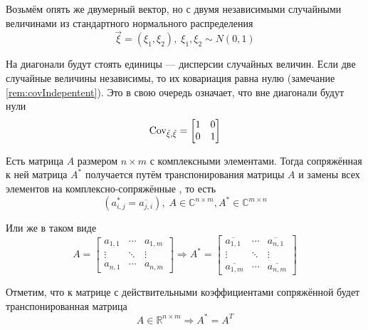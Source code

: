 \begin{example}
    Возьмём опять же двумерный вектор, но с двумя независимыми
    случайными величинами из стандартного нормального распределения
    $$\vec{\xi} = \left( \xi_1, \xi_2 \right),\;
        \xi_1, \xi_2 \sim N\left( 0, 1 \right)$$

    На диагонали будут стоять единицы --- дисперсии случайных величин.
    Если две случайные величины независимы, то их ковариация равна нулю
    (замечание \ref{rem:covIndepentent}).
    Это в свою очередь означает, что вне диагонали
    будут нули
    $$\operatorname{Cov_{\vec{\xi}, \vec{\xi}}} =
    \begin{bmatrix}
        1 & 0 \\
        0 & 1
    \end{bmatrix}$$
\end{example}

\begin{definition}
    Есть матрица $A$ размером $n \times m$ с комплексными элементами.
    Тогда сопряжённая к ней матрица $A^*$ получается путём транспонирования
    матрицы $A$ и замены всех элементов на комплексно-сопряжённые
    \cite[с.~243]{VoevodinLA}, то есть
    $$\left( a_{i,j}^* = \overline{a_{j,i}} \right),\;
    A \in \mathbb{C}^{n \times m}, A^* \in \mathbb{C}^{m \times n}$$

    Или же в таком виде
    $$A =
    \begin{bmatrix}
        a_{1,1} & \cdots & a_{1,m} \\
        \vdots & \ddots & \vdots \\
        a_{n,1} & \cdots & a_{n,m}
    \end{bmatrix}
        \Rightarrow
    A^* = 
    \begin{bmatrix}
        \overline{a_{1,1}} & \cdots & \overline{a_{n,1}} \\
        \vdots & \ddots & \vdots \\
        \overline{a_{1,m}} & \cdots & \overline{a_{n,m}}
    \end{bmatrix}$$
\end{definition}

\begin{remark}
    Отметим, что к матрице с действительными коэффициентами сопряжённой будет
    транспонированная матрица
    $$A \in \mathbb{R}^{n \times m} \Rightarrow A^* = A^T$$
\end{remark}

